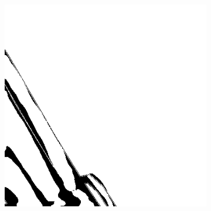 \documentclass[10pt,conference,compsocconf]{IEEEtran}
\begin{document}
\begin{figure}
\begin{subfigure}[b]{0.3\columnwidth}
    \end{subfigure}
    \begin{subfigure}[b]{0.3\columnwidth}
      \includegraphics[width=\columnwidth]{figures/training_hard/eval_orror_004.png}
    \end{subfigure}


\end{figure}
\end{document}
